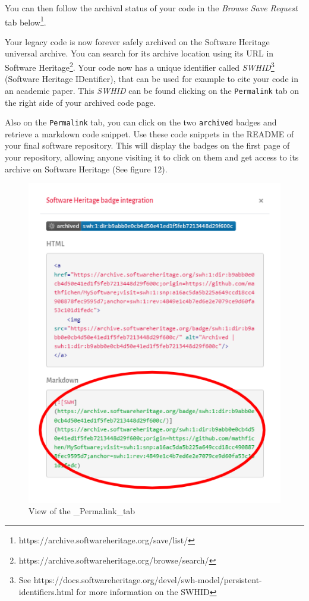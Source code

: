 \documentclass[]{article}
\newcommand{\passthrough}[1]{#1}
\begin{document}
You can then follow the archival status of your code in the \emph{Browse
Save Request} tab below\footnote{https://archive.softwareheritage.org/save/list/}.

Your legacy code is now forever safely archived on the Software Heritage
universal archive. You can search for its archive location using its URL
in Software Heritage\footnote{https://archive.softwareheritage.org/browse/search/}.
Your code now has a unique identifier called \emph{SWHID}\footnote{See
  https://docs.softwareheritage.org/devel/swh-model/persistent-identifiers.html
  for more information on the SWHID} (Software Heritage IDentifier),
that can be used for example to cite your code in an academic paper.
This \emph{SWHID} can be found clicking on the
\passthrough{\lstinline!Permalink!} tab on the right side of your
archived code page.

Also on the \passthrough{\lstinline!Permalink!} tab, you can click on
the two \passthrough{\lstinline!archived!} badges and retrieve a
markdown code snippet. Use these code snippets in the README of your
final software repository. This will display the badges on the first
page of your repository, allowing anyone visiting it to click on them
and get access to its archive on Software Heritage (See figure 12).

\begin{figure}
\hypertarget{fig:badge}{%
\centering
\includegraphics{./media2/20_SWHbadges.png}
\caption{View of the \_Permalink\_tab}\label{fig:badge}
}
\end{figure}
\end{document}

